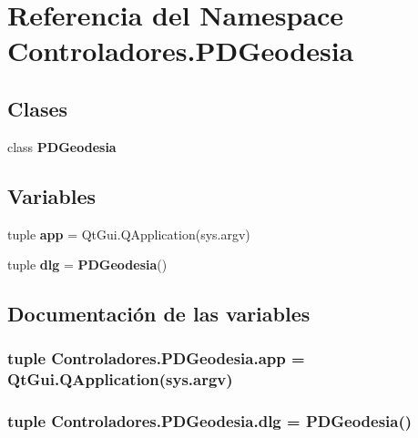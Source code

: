 \section{Referencia del Namespace Controladores.\-P\-D\-Geodesia}
\label{namespaceControladores_1_1PDGeodesia}
\subsection*{Clases}
\begin{DoxyCompactItemize}
\item 
class {\bf P\-D\-Geodesia}
\end{DoxyCompactItemize}
\subsection*{Variables}
\begin{DoxyCompactItemize}
\item 
tuple {\bf app} = Qt\-Gui.\-Q\-Application(sys.\-argv)
\item 
tuple {\bf dlg} = {\bf P\-D\-Geodesia}()
\end{DoxyCompactItemize}


\subsection{Documentación de las variables}
\subsubsection[{app}]{\setlength{\rightskip}{0pt plus 5cm}tuple Controladores.\-P\-D\-Geodesia.\-app = Qt\-Gui.\-Q\-Application(sys.\-argv)}\label{namespaceControladores_1_1PDGeodesia_a4054b87af3fe3ad5f6d671c58144b8da}
\subsubsection[{dlg}]{\setlength{\rightskip}{0pt plus 5cm}tuple Controladores.\-P\-D\-Geodesia.\-dlg = {\bf P\-D\-Geodesia}()}\label{namespaceControladores_1_1PDGeodesia_ac51f0f9b309ddadd9f1161a5619205ee}
